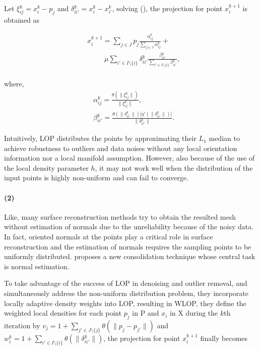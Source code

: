 Let $\xi{_{ij}^k}=x{_i^k}-p_{j}$ and $\delta{_{ii'}^k}=x{_i^k}-x{_{i'}^k}$, solving (), the projection for point $x{_i^{k+1}}$ is obtained as

\small{
\begin{equation}
 \label{eq:WLOP1}
 \begin{split}
 & x{_i^{k+1}}=\sum_{j\in J}^{}p_{j}\frac{\alpha{_{ij}^k}}{\sum_{j\in J}^{}\alpha{_{ij}^k}}+ \\
 &~~~~~~~~~~~\mu\sum_{{i'}\in I\setminus\{i\}}^{}\delta{_{ii'}^k}\frac{\beta{_{ii'}^k}}{\sum_{{i'}\in I\setminus\{i\}}^{}\beta{_{ii'}^k}},
 \end{split}
\end{equation}
}
\\
where, \small{
\begin{equation}
 \label{eq:WLOP2}
 \begin{split}
 & \alpha{_{ij}^k}=\frac{\theta(\|\xi{_{ij}^k}\|)}{\|\xi{_{ij}^k}\|}, \\
 & \beta{_{ii'}^k}=\frac{\theta(\|\delta{_{ii'}^k}\|)|\eta'(\|\delta{_{ii'}^k}\|)|}{\|\delta{_{ii'}^k}\|}.
 \end{split}
\end{equation}
}

Intuitively, LOP distributes the points by approximating their $L_1$ median to achieve robustness to outliers and data noises without any local orientation information nor a local manifold assumption.
However, also because of the use of the local density parameter $h$, it may not work well when the distribution of the input points is highly non-uniform and can fail to converge.

\paragraph{(2)}
Like\cite{lipman2007parameterization}, many surface reconstruction methods try to obtain the resulted mesh without estimation of normals due to the unreliability because of the noisy data.
In fact, oriented normals at the points play a critical role in surface reconstruction and the estimation of normals requires the sampling points to be uniformly distributed.
\cite{huang2009consolidation} proposes a new consolidation technique whose central task is normal estimation.

To take advantage of the success of LOP in denoising and outlier removal, and simultaneously address the non-uniform distribution problem, they incorporate locally adaptive density weights into LOP, resulting in WLOP, they define the weighted local densities for each point $p_{j}$ in P and $x_{i}$ in X during the $k$th iteration by $v_{j}=1+\sum_{j'\in J\setminus\{j\}}^{}\theta(\|p_{j}-p_{j'}\|)$ and $w{_i^k}=1+\sum_{i'\in I\setminus\{i\}}^{}\theta(\|\delta{_{ii'}^k}\|)$, the projection for point $x{_i^{k+1}}$ finally becomes

